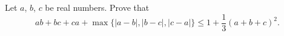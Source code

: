 Let $a$,  $b$,  $c$ be real numbers.  Prove that\[ab + bc + ca + \max\{|a - b|, |b - c|, |c - a|\} \le 1 + \frac{1}{3} (a + b + c)^2.\]